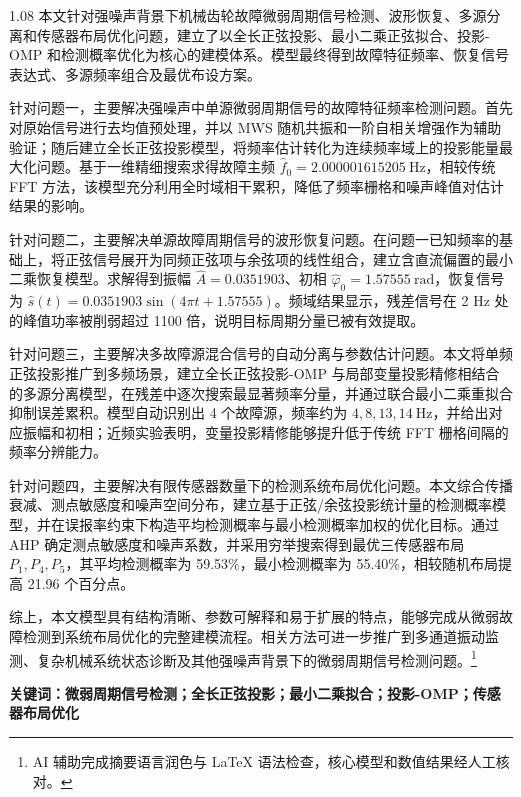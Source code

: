 \documentclass[UTF8,a4paper,12pt]{ctexart}
\numberwithin{figure}{section}
\numberwithin{table}{section}
\newcommand{\ainote}[1]{\footnote{\small #1}}
\begin{document}
{\small
\begin{spacing}{1.08}
本文针对强噪声背景下机械齿轮故障微弱周期信号检测、波形恢复、多源分离和传感器布局优化问题，建立了以全长正弦投影、最小二乘正弦拟合、投影-OMP 和检测概率优化为核心的建模体系。模型最终得到故障特征频率、恢复信号表达式、多源频率组合及最优布设方案。

针对问题一，主要解决强噪声中单源微弱周期信号的故障特征频率检测问题。首先对原始信号进行去均值预处理，并以 MWS 随机共振和一阶自相关增强作为辅助验证；随后建立全长正弦投影模型，将频率估计转化为连续频率域上的投影能量最大化问题。基于一维精细搜索求得故障主频 \(\hat f_0=2.000001615205\ \mathrm{Hz}\)，相较传统 FFT 方法，该模型充分利用全时域相干累积，降低了频率栅格和噪声峰值对估计结果的影响。

针对问题二，主要解决单源故障周期信号的波形恢复问题。在问题一已知频率的基础上，将正弦信号展开为同频正弦项与余弦项的线性组合，建立含直流偏置的最小二乘恢复模型。求解得到振幅 \(\hat A=0.0351903\)、初相 \(\hat\varphi_0=1.57555\ \mathrm{rad}\)，恢复信号为 \(\hat s(t)=0.0351903\sin(4\pi t+1.57555)\)。频域结果显示，残差信号在 2 Hz 处的峰值功率被削弱超过 1100 倍，说明目标周期分量已被有效提取。

针对问题三，主要解决多故障源混合信号的自动分离与参数估计问题。本文将单频正弦投影推广到多频场景，建立全长正弦投影-OMP 与局部变量投影精修相结合的多源分离模型，在残差中逐次搜索最显著频率分量，并通过联合最小二乘重拟合抑制误差累积。模型自动识别出 4 个故障源，频率约为 \(4,8,13,14\ \mathrm{Hz}\)，并给出对应振幅和初相；近频实验表明，变量投影精修能够提升低于传统 FFT 栅格间隔的频率分辨能力。

针对问题四，主要解决有限传感器数量下的检测系统布局优化问题。本文综合传播衰减、测点敏感度和噪声空间分布，建立基于正弦/余弦投影统计量的检测概率模型，并在误报率约束下构造平均检测概率与最小检测概率加权的优化目标。通过 AHP 确定测点敏感度和噪声系数，并采用穷举搜索得到最优三传感器布局 \(P_1,P_4,P_5\)，其平均检测概率为 59.53\%，最小检测概率为 55.40\%，相较随机布局提高 21.96 个百分点。

综上，本文模型具有结构清晰、参数可解释和易于扩展的特点，能够完成从微弱故障检测到系统布局优化的完整建模流程。相关方法可进一步推广到多通道振动监测、复杂机械系统状态诊断及其他强噪声背景下的微弱周期信号检测问题。\ainote{AI 辅助完成摘要语言润色与 LaTeX 语法检查，核心模型和数值结果经人工核对。}
\end{spacing}
}

\vspace{0.35cm}

\textbf{\noindent 关键词：微弱周期信号检测；全长正弦投影；最小二乘拟合；投影-OMP；传感器布局优化}
\end{document}
